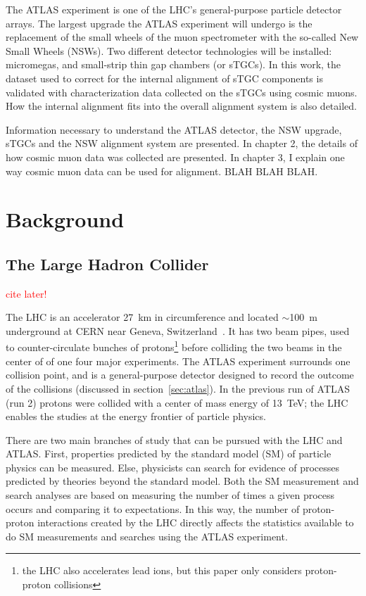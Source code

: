 The ATLAS experiment is one of the LHC's general-purpose particle detector arrays. The largest upgrade the ATLAS experiment will undergo is the replacement of the small wheels of the muon spectrometer with the so-called New Small Wheels (NSWs). Two different detector technologies will be installed: micromegas, and small-strip thin gap chambers (or sTGCs). In this work, the dataset used to correct for the internal alignment of sTGC components is validated with characterization data collected on the sTGCs using cosmic muons. How the internal alignment fits into the overall alignment system is also detailed. 

Information necessary to understand the ATLAS detector, the NSW upgrade, sTGCs and the NSW alignment system are presented. In chapter 2, the details of how cosmic muon data was collected are presented. In chapter 3, I explain one way cosmic muon data can be used for alignment. BLAH BLAH BLAH. 

\section{Background}

\subsection{The Large Hadron Collider}
\textcolor{red}{cite later!}

The LHC is an accelerator \SI{27}{\kilo\meter} in circumference and located $\sim$\SI{100}{\meter} underground at CERN near Geneva, Switzerland~\cite{evans_lhc_2008}. It has two beam pipes, used to counter-circulate bunches of protons\footnote{the LHC also accelerates lead ions, but this paper only considers proton-proton collisions} before colliding the two beams in the center of of one four major experiments. The ATLAS experiment surrounds one collision point, and is a general-purpose detector designed to record the outcome of the collisions (discussed in section~\ref{sec:atlas}). In the previous run of ATLAS (run 2) protons were collided with a center of mass energy of \SI{13}{\tera\electronvolt}; the LHC enables the studies at the energy frontier of particle physics. 

There are two main branches of study that can be pursued with the LHC and ATLAS. First, properties predicted by the standard model (SM) of particle physics can be measured. Else, physicists can search for evidence of processes predicted by theories beyond the standard model. Both the SM measurement and search analyses are based on measuring the number of times a given process occurs and comparing it to expectations. In this way, the number of proton-proton interactions created by the LHC directly affects the statistics available to do SM measurements and searches using the ATLAS experiment.

